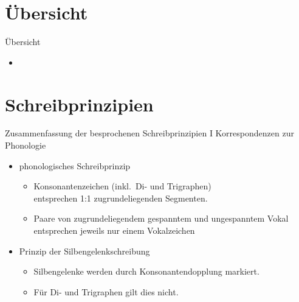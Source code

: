\section{Übersicht}

\begin{frame}
  {Übersicht}
  \onslide<+->
  \begin{itemize}[<+->]
    \item \citet{Schaefer2018b}
  \end{itemize}
\end{frame}

\section[Prinzipien]{Schreibprinzipien}

\begin{frame}
  {Zusammenfassung der besprochenen Schreibprinzipien I}
  \pause
  Korrespondenzen zur Phonologie\\
  \Zeile
  \pause
  \begin{itemize}[<+->]
    \item \alert{phonologisches Schreibprinzip}
      \begin{itemize}[<+->]
        \item Konsonantenzeichen (inkl.\ Di- und Trigraphen)\\
          entsprechen 1:1 zugrundeliegenden Segmenten.
        \item Paare von zugrundeliegendem gespanntem und ungespanntem Vokal\\
          entsprechen jeweils nur einem Vokalzeichen 
      \end{itemize}
     \Zeile 
    \item \alert{Prinzip der Silbengelenkschreibung}
      \begin{itemize}[<+->]
        \item Silbengelenke werden durch Konsonantendopplung markiert.
        \item Für Di- und Trigraphen gilt dies nicht.
      \end{itemize}
  \end{itemize}
\end{frame}

